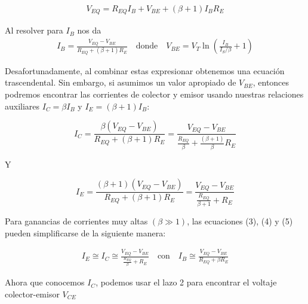 \documentclass{article}
\begin{document}
\begin{align}
	V_{EQ} = R_{EQ}I_B + V_{BE} + (\beta + 1)I_BR_E
\end{align}

\noindent Al resolver para $I_B$ nos da
\begin{align}
	I_B = \frac{V_{EQ} - V_{BE}}{R_{EQ} + (\beta + 1)R_E} \,\,\,\,\,\, \text{donde} \,\,\,\,\,\, V_{BE} = V_T \ln \left( \frac{I_B}{I_S/\beta} + 1\right)
\end{align}

\noindent Desafortunadamente, al combinar estas expresionar obtenemos una ecuación trascendental. Sin embargo, si asumimos un valor apropiado de $V_{BE}$, entonces podremos encontrar las corrientes de colector y emisor usando nuestras relaciones auxiliares $I_C = \beta I_B$ y $I_E = (\beta + 1)I_B$:

\begin{tcolorbox}[colback=red!5!white,colframe=red!75!black,arc=0mm,boxrule=0mm,width=(\linewidth+0.5cm),extrude right by=-1.5cm]
	\begin{equation}
		I_C = \frac{\beta(V_{EQ} - V_{BE})}{R_{EQ} + (\beta + 1)R_E} = \frac{V_{EQ} - V_{BE}}{\frac{R_{EQ}}{\beta} + \frac{(\beta + 1)}{\beta}R_E}
	\end{equation}
\end{tcolorbox}

\noindent Y

\begin{tcolorbox}[colback=red!5!white,colframe=red!75!black,arc=0mm,boxrule=0mm,width=(\linewidth+0.5cm),extrude right by=-1.5cm]
	\begin{equation}
		I_E = \frac{(\beta + 1)(V_{EQ} - V_{BE})}{R_{EQ} + (\beta + 1)R_E} = \frac{V_{EQ} - V_{BE}}{ \frac{R_{EQ}}{\beta + 1} + R_E} 
	\end{equation}
\end{tcolorbox}

\noindent Para ganancias de corrientes muy altas $(\beta \gg 1)$, las ecuaciones (3), (4) y (5) pueden simplificarse de la siguiente manera:

\begin{align}
	I_E \cong I_C \cong \frac{V_{EQ} - V_{BE}}{ \frac{R_{EQ}}{\beta} + R_E} \,\,\,\,\,\, \text{con} \,\,\,\,\,\, I_B \cong \frac{V_{EQ} - V_{BE}}{R_{EQ} + \beta R_E}
\end{align}

\noindent Ahora que conocemos $I_C$, podemos usar el lazo 2 para encontrar el voltaje colector-emisor $V_{CE}$ 
\end{document}
